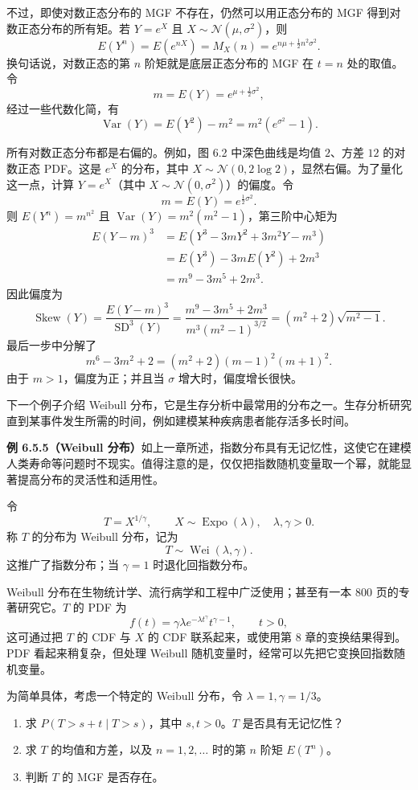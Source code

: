\documentclass[UTF8,12pt,a4paper,fontset=fandol]{ctexart}
\begin{document}
不过，即使对数正态分布的 MGF 不存在，仍然可以用正态分布的 MGF 得到对数正态分布的所有矩。若 $Y=e^X$ 且 $X\sim\mathcal{N}(\mu,\sigma^2)$，则
\[
  E(Y^n)=E(e^{nX})=M_X(n)=e^{n\mu+\frac12n^2\sigma^2}.
\]
换句话说，对数正态的第 $n$ 阶矩就是底层正态分布的 MGF 在 $t=n$ 处的取值。令
\[
  m=E(Y)=e^{\mu+\frac12\sigma^2},
\]
经过一些代数化简，有
\[
  \operatorname{Var}(Y)=E(Y^2)-m^2=m^2(e^{\sigma^2}-1).
\]

所有对数正态分布都是右偏的。例如，图 6.2 中深色曲线是均值 $2$、方差 $12$ 的对数正态 PDF。这是 $e^X$ 的分布，其中 $X\sim\mathcal{N}(0,2\log2)$，显然右偏。为了量化这一点，计算 $Y=e^X$（其中 $X\sim\mathcal{N}(0,\sigma^2)$）的偏度。令
\[
  m=E(Y)=e^{\frac12\sigma^2}.
\]
则 $E(Y^n)=m^{n^2}$ 且 $\operatorname{Var}(Y)=m^2(m^2-1)$，第三阶中心矩为
\begin{align*}
  E(Y-m)^3
  &=E(Y^3-3mY^2+3m^2Y-m^3)\\
  &=E(Y^3)-3mE(Y^2)+2m^3\\
  &=m^9-3m^5+2m^3.
\end{align*}
因此偏度为
\[
  \operatorname{Skew}(Y)
  =
  \frac{E(Y-m)^3}{\operatorname{SD}^3(Y)}
  =
  \frac{m^9-3m^5+2m^3}{m^3(m^2-1)^{3/2}}
  =
  (m^2+2)\sqrt{m^2-1}.
\]
最后一步中分解了
\[
  m^6-3m^2+2=(m^2+2)(m-1)^2(m+1)^2.
\]
由于 $m>1$，偏度为正；并且当 $\sigma$ 增大时，偏度增长很快。

下一个例子介绍 Weibull 分布，它是生存分析中最常用的分布之一。生存分析研究直到某事件发生所需的时间，例如建模某种疾病患者能存活多长时间。

\noindent\textbf{例 6.5.5（Weibull 分布）}\quad 如上一章所述，指数分布具有无记忆性，这使它在建模人类寿命等问题时不现实。值得注意的是，仅仅把指数随机变量取一个幂，就能显著提高分布的灵活性和适用性。

令
\[
  T=X^{1/\gamma},\qquad X\sim\operatorname{Expo}(\lambda),\quad \lambda,\gamma>0.
\]
称 $T$ 的分布为 Weibull 分布，记为
\[
  T\sim\operatorname{Wei}(\lambda,\gamma).
\]
这推广了指数分布；当 $\gamma=1$ 时退化回指数分布。

Weibull 分布在生物统计学、流行病学和工程中广泛使用；甚至有一本 800 页的专著研究它。$T$ 的 PDF 为
\[
  f(t)=\gamma\lambda e^{-\lambda t^\gamma}t^{\gamma-1},\qquad t>0,
\]
这可通过把 $T$ 的 CDF 与 $X$ 的 CDF 联系起来，或使用第 8 章的变换结果得到。PDF 看起来稍复杂，但处理 Weibull 随机变量时，经常可以先把它变换回指数随机变量。

为简单具体，考虑一个特定的 Weibull 分布，令 $\lambda=1,\gamma=1/3$。

\begin{enumerate}
  \item 求 $P(T>s+t\mid T>s)$，其中 $s,t>0$。$T$ 是否具有无记忆性？
  \item 求 $T$ 的均值和方差，以及 $n=1,2,\ldots$ 时的第 $n$ 阶矩 $E(T^n)$。
  \item 判断 $T$ 的 MGF 是否存在。
\end{enumerate}
\end{document}

